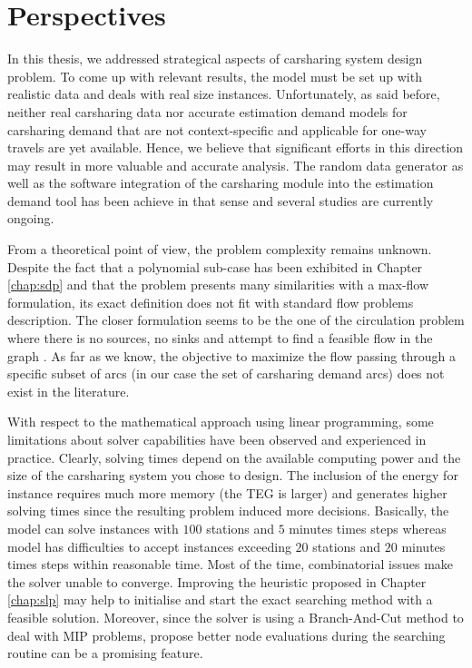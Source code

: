 \section{Perspectives}
In this thesis, we addressed strategical aspects of carsharing system design problem.
To come up with relevant results, the model must be set up with realistic data and deals with real size instances.
Unfortunately, as said before, neither real carsharing data nor accurate estimation demand models for carsharing demand that are not context-specific and applicable for one-way travels are yet available.
Hence, we believe that significant efforts in this direction may result in more valuable and accurate analysis.
The random data generator as well as the software integration of the carsharing module into the estimation demand tool has been achieve in that sense and several studies are currently ongoing.


\medskip
From a theoretical point of view, the {\SDP} problem complexity remains unknown.
Despite the fact that a polynomial sub-case has been exhibited in Chapter \ref{chap:sdp} and that the problem presents many similarities with a max-flow formulation, its exact definition does not fit with standard flow problems description.
The closer formulation seems to be the one of the circulation problem where there is no sources, no sinks and attempt to find a feasible flow in the graph \cite{ahuja_network_1993}.
As far as we know, the objective to maximize the flow passing through a specific subset of arcs (in our case the set of carsharing demand arcs) does not exist in the literature.


\medskip
With respect to the mathematical approach using linear programming, some limitations about solver capabilities have been observed and experienced in practice.
Clearly, solving times depend on the available computing power and the size of the carsharing system you chose to design.
The inclusion of the energy for instance requires much more memory (the TEG is larger) and generates higher solving times since the resulting problem induced more decisions.
Basically, the {\SDP} model can solve instances with $100$ stations and $5$ minutes times steps whereas {\ENERGY} model has difficulties to accept instances exceeding $20$ stations and $20$ minutes times steps within reasonable time.
Most of the time, combinatorial issues make the solver unable to converge.
Improving the heuristic proposed in Chapter \ref{chap:slp} may help to initialise and start the exact searching method with a feasible solution.
Moreover, since the solver is using a Branch-And-Cut method to deal with MIP problems, propose better node evaluations during the searching routine can be a promising feature.



